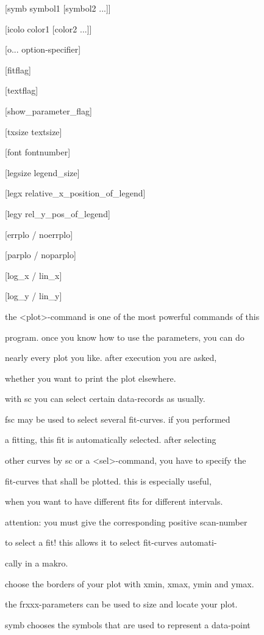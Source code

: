 \documentclass[]{article}
\begin{document}
{[}symb symbol1 {[}symbol2 ...{]}{]}

{[}icolo color1 {[}color2 ...{]}{]}

{[}o... option-specifier{]}

{[}fitflag{]}

{[}textflag{]}

{[}show\_parameter\_flag{]}

{[}txsize textsize{]}

{[}font fontnumber{]}

{[}legsize legend\_size{]}

{[}legx relative\_x\_position\_of\_legend{]}

{[}legy rel\_y\_pos\_of\_legend{]}

{[}errplo / noerrplo{]}

{[}parplo / noparplo{]}

{[}log\_x / lin\_x{]}

{[}log\_y / lin\_y{]}

the \textless{}plot\textgreater{}-command is one of the most powerful
commands of this

program. once you know how to use the parameters, you can do

nearly every plot you like. after execution you are asked,

whether you want to print the plot elsewhere.

with sc you can select certain data-records as usually.

fsc may be used to select several fit-curves. if you performed

a fitting, this fit is automatically selected. after selecting

other curves by sc or a \textless{}sel\textgreater{}-command, you have
to specify the

fit-curves that shall be plotted. this is especially useful,

when you want to have different fits for different intervals.

attention: you must give the corresponding positive scan-number

to select a fit! this allows it to select fit-curves automati-

cally in a makro.

choose the borders of your plot with xmin, xmax, ymin and ymax.

the frxxx-parameters can be used to size and locate your plot.

symb chooses the symbols that are used to represent a data-point
\end{document}
